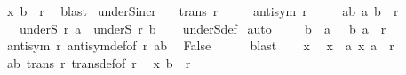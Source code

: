 \begin{isabellebody}
\ {\isachardoublequoteopen}{\isacharparenleft}{\kern0pt}x{\isacharcomma}{\kern0pt}\ b{\isacharparenright}{\kern0pt}\ {\isasymin}\ r{\isachardoublequoteclose}\ \isamarkupfalse%
\ blast\isanewline
{}\isamarkupfalse%
%
\endisatagproof
{\isafoldproof}%
%
\isadelimproof
\isanewline
%
\endisadelimproof
\isanewline
{}\isamarkupfalse%
\ underS{\isacharunderscore}{\kern0pt}incr{\isacharcolon}{\kern0pt}\isanewline
\ \ \ {\isachardoublequoteopen}trans\ r{\isachardoublequoteclose}\isanewline
\ \ \ \ \ {\isachardoublequoteopen}antisym\ r{\isachardoublequoteclose}\isanewline
\ \ \ \ \ ab{\isacharcolon}{\kern0pt}\ {\isachardoublequoteopen}{\isacharparenleft}{\kern0pt}a{\isacharcomma}{\kern0pt}\ b{\isacharparenright}{\kern0pt}\ {\isasymin}\ r{\isachardoublequoteclose}\isanewline
\ \ \ {\isachardoublequoteopen}underS\ r\ a\ {\isasymsubseteq}\ underS\ r\ b{\isachardoublequoteclose}\isanewline
%
\isadelimproof
\ \ %
\endisadelimproof
%
\isatagproof
{}\isamarkupfalse%
\ underS{\isacharunderscore}{\kern0pt}def\isanewline
{}\isamarkupfalse%
\ auto\isanewline
\ \ \isamarkupfalse%
\ {\isacharasterisk}{\kern0pt}{\isacharcolon}{\kern0pt}\ {\isachardoublequoteopen}b\ {\isasymnoteq}\ a{\isachardoublequoteclose}\ \ {\isacharasterisk}{\kern0pt}{\isacharasterisk}{\kern0pt}{\isacharcolon}{\kern0pt}\ {\isachardoublequoteopen}{\isacharparenleft}{\kern0pt}b{\isacharcomma}{\kern0pt}\ a{\isacharparenright}{\kern0pt}\ {\isasymin}\ r{\isachardoublequoteclose}\isanewline
\ \ \isamarkupfalse%
\ {\isacartoucheopen}antisym\ r{\isacartoucheclose}\ antisym{\isacharunderscore}{\kern0pt}def{\isacharbrackleft}{\kern0pt}of\ r{\isacharbrackright}{\kern0pt}\ ab\ \isamarkupfalse%
\ False\isanewline
\ \ \ \ \isamarkupfalse%
\ blast\isanewline
{}\isamarkupfalse%
\isanewline
\ \ \isamarkupfalse%
\ x\ \isamarkupfalse%
\ {\isachardoublequoteopen}x\ {\isasymnoteq}\ a{\isachardoublequoteclose}\ {\isachardoublequoteopen}{\isacharparenleft}{\kern0pt}x{\isacharcomma}{\kern0pt}\ a{\isacharparenright}{\kern0pt}\ {\isasymin}\ r{\isachardoublequoteclose}\isanewline
\ \ \isamarkupfalse%
\ ab\ {\isacartoucheopen}trans\ r{\isacartoucheclose}\ trans{\isacharunderscore}{\kern0pt}def{\isacharbrackleft}{\kern0pt}of\ r{\isacharbrackright}{\kern0pt}\ \isamarkupfalse%
\ {\isachardoublequoteopen}{\isacharparenleft}{\kern0pt}x{\isacharcomma}{\kern0pt}\ b{\isacharparenright}{\kern0pt}\ {\isasymin}\ r{\isachardoublequoteclose}\isanewline

\end{isabellebody}
